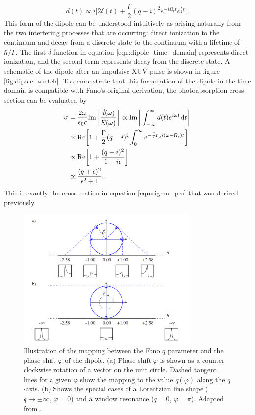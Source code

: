 \begin{equation}
\label{eqn:dipole_time_domain}
	d(t)\propto i\bigg[ 2\delta(t) + \frac{\Gamma}{2}(q-i)^2 e^{-i\Omega_r t}e^{\frac{\Gamma}{2}t} \bigg].
\end{equation}
This form of the dipole can be understood intuitively as arising naturally from the two interfering processes that are occurring: direct ionization to the continuum and decay from a discrete state to the continuum with a lifetime of $\hbar/\Gamma$.  The first $\delta$-function in equation \ref{eqn:dipole_time_domain} represents direct ionization, and the second term represents decay from the discrete state.  A schematic of the dipole after an impulsive XUV pulse is shown in  figure \ref{fig:dipole_sketch}.  To demonstrate that this formulation of the dipole in the time domain is compatible with Fano's original derivation, the photoabsorption cross section can be evaluated by
\begin{equation}
\begin{aligned}
	\sigma&=\frac{2\omega}{\epsilon_0 c}\mathrm{Im}\bigg[\frac{\tilde{d}(\omega)}{\tilde{E}(\omega)}\bigg]\propto \mathrm{Im}\bigg[\int_{-\infty}^{\infty} d(t) e^{i\omega t} \mathop{}\!\mathrm{d} t\bigg]\\
	&\propto\mathrm{Re}\bigg[1+\frac{\Gamma}{2}(q-i)^2\int_0^\infty e^{-\frac{\Gamma}{2}t}e^{i(\omega-\Omega_r)t}\bigg]\\
	&\propto\mathrm{Re}\bigg[1 + \frac{(q-i)^2}{1-i\epsilon}\bigg]\\
	& \propto \frac{(q+\epsilon)^2}{\epsilon^2 +1}.
\end{aligned}
\end{equation}
This is exactly the cross section in equation \ref{eqn:sigma_pcs} that was derived previously.

\begin{figure}
	\centering
	\includegraphics[width=0.8\textwidth]{figures/ATS/Kaldun.png}
	\caption{Illustration of the mapping between the Fano $q$ parameter and the phase shift $\varphi$ of the dipole. (a) Phase shift $\varphi$ is shown as a counter-clockwise rotation of a vector on the unit circle. Dashed tangent lines for a given $\varphi$ show the mapping to the value $q(\varphi)$ along the $q$-axis. (b) Shows the special cases of a Lorentzian line shape ($q\rightarrow\pm\infty$, $\varphi=0$) and a window resonance ($q=0$, $\varphi=\pi$).  Adapted from \cite{kaldunFanoResonancesTime2014}.}
	\label{fig:q_to_phi}
\end{figure}

